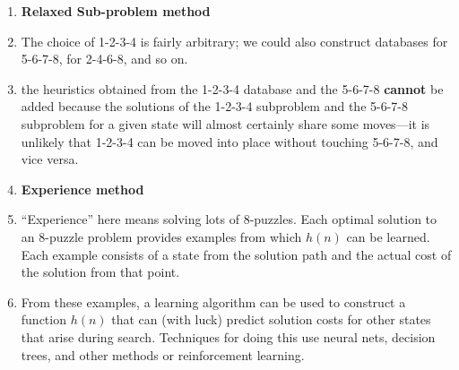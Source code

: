 \begin{enumerate}
    \item[] \textbf{Relaxed Sub-problem method}

    \item The choice of 1-2-3-4 is fairly arbitrary; we could also construct databases for 5-6-7-8, for 2-4-6-8, and so on.
    \hfill \cite{ai/book/Artificial-Intelligence-A-Modern-Approach/Russell-Norvig}

    \item the heuristics obtained from the 1-2-3-4 database and the 5-6-7-8 \textbf{cannot} be added
     because the solutions of the 1-2-3-4 subproblem and the 5-6-7-8 subproblem for a given state will almost certainly share some moves—it is unlikely that 1-2-3-4 can be moved into place without touching 5-6-7-8, and vice versa.
    \hfill \cite{ai/book/Artificial-Intelligence-A-Modern-Approach/Russell-Norvig}

    \item[] \textbf{Experience method}

    \item “Experience” here means solving lots of $8$-puzzles.
    Each optimal solution to an 8-puzzle problem provides examples from which $h(n)$ can be learned.
    Each example consists of a state from the solution path and the actual cost of the solution from that point.
    \hfill \cite{ai/book/Artificial-Intelligence-A-Modern-Approach/Russell-Norvig}

    \item From these examples, a learning algorithm can be used to construct a function $h(n)$ that can (with luck) predict solution costs for other states that arise during search.
    Techniques for doing this use neural nets, decision trees, and other methods or reinforcement learning.
    \hfill \cite{ai/book/Artificial-Intelligence-A-Modern-Approach/Russell-Norvig}
\end{enumerate}
















